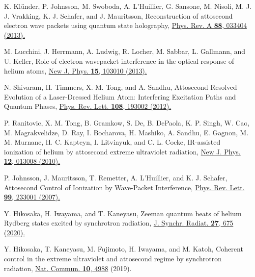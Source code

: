 \documentclass[7pt]{article}
\begin{document}
\begin{multicols}{2}
\begin{thebibliography}{30}
\bibitem{} K. Klünder, P. Johnsson, M. Swoboda, A. L’Huillier, G.
Sansone, M. Nisoli, M. J. J. Vrakking, K. J. Schafer, and J.
Mauritsson, Reconstruction of attosecond electron wave packets using quantum state holography, \href{https://journals.aps.org/pra/abstract/10.1103/PhysRevA.88.033404}{Phys. Rev. A \textbf{88}, 033404
(2013).}
\vspace{-1.5mm}

\bibitem{} M. Lucchini, J. Herrmann, A. Ludwig, R. Locher, M. Sabbar,
L. Gallmann, and U. Keller, Role of electron wavepacket interference in the optical response of helium atoms, \href{https://iopscience.iop.org/article/10.1088/1367-2630/15/10/103010}{New J. Phys.
\textbf{15}, 103010 (2013).}
\vspace{-1.5mm}

\bibitem{} N. Shivaram, H. Timmers, X.-M. Tong, and A. Sandhu,
Attosecond-Resolved Evolution of a Laser-Dressed Helium
Atom: Interfering Excitation Paths and Quantum Phases, \href{https://journals.aps.org/prl/abstract/10.1103/PhysRevLett.108.193002}{Phys.
Rev. Lett. \textbf{108}, 193002 (2012).}
\vspace{-1.5mm}

\bibitem{} P. Ranitovic, X. M. Tong, B. Gramkow, S. De, B. DePaola,
K. P. Singh, W. Cao, M. Magrakvelidze, D. Ray, I. Bocharova,
H. Mashiko, A. Sandhu, E. Gagnon, M. M. Murnane, H. C.
Kapteyn, I. Litvinyuk, and C. L. Cocke, IR-assisted ionization
of helium by attosecond extreme ultraviolet radiation, \href{https://iopscience.iop.org/article/10.1088/1367-2630/12/1/013008}{New J.
Phys. \textbf{12}, 013008 (2010).}
\vspace{-1.5mm}

\bibitem{} P. Johnsson, J. Mauritsson, T. Remetter, A. L’Huillier, and K. J.
Schafer, Attosecond Control of Ionization by Wave-Packet Interference, \href{https://journals.aps.org/prl/abstract/10.1103/PhysRevLett.99.233001}{Phys. Rev. Lett. \textbf{99}, 233001 (2007).}
\vspace{-1.5mm}

\bibitem{} Y. Hikosaka, H. Iwayama, and T. Kaneyasu, Zeeman quantum
beats of helium Rydberg states excited by synchrotron radiation, \href{https://scripts.iucr.org/cgi-bin/paper?S1600577520002829}{J. Synchr. Radiat. \textbf{27}, 675 (2020).}
\vspace{-1.5mm}

\bibitem{} Y. Hikosaka, T. Kaneyasu, M. Fujimoto, H. Iwayama, and M.
Katoh, Coherent control in the extreme ultraviolet and attosecond regime by synchrotron radiation, \href{https://www.nature.com/articles/s41467-019-12978-w}{Nat. Commun. \textbf{10}, 4988}
(2019).
\vspace{-1.5mm}


\end{thebibliography}
\end{multicols}
\end{document}
